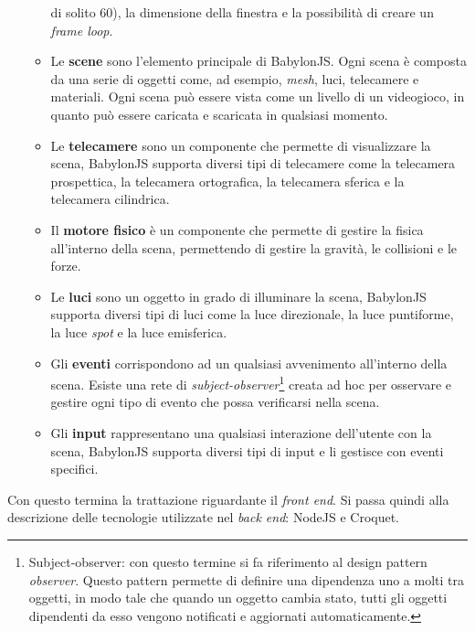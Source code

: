 \begin{itemize}
\begin{itemize}
        di solito 60), la dimensione della finestra e la possibilità di creare un \textit{frame loop}.
        \item Le \textbf{scene} sono l'elemento principale di BabylonJS. Ogni scena è composta da una serie di oggetti come, ad esempio, \textit{mesh}, luci, telecamere e materiali. Ogni scena
        può essere vista come un livello di un videogioco, in quanto può essere caricata e scaricata in qualsiasi momento.
        \item Le \textbf{telecamere} sono un componente che permette di visualizzare la scena, BabylonJS supporta diversi tipi di telecamere come la telecamera prospettica, la telecamera ortografica,
        la telecamera sferica e la telecamera cilindrica.
        \item Il \textbf{motore fisico} è un componente che permette di gestire la fisica all'interno della scena, permettendo di gestire la gravità, le collisioni e le forze.
        \item Le \textbf{luci} sono un oggetto in grado di illuminare la scena, BabylonJS supporta diversi tipi di luci come la luce direzionale, la luce puntiforme, la luce 
        \textit{spot} e la luce emisferica.
        \item Gli \textbf{eventi} corrispondono ad un qualsiasi avvenimento all'interno della scena. Esiste una rete di \textit{subject-observer}\footnote{
            Subject-observer: con questo termine si fa riferimento al design pattern \textit{observer}. Questo pattern permette di definire una dipendenza uno a molti tra oggetti,
            in modo tale che quando un oggetto cambia stato, tutti gli oggetti dipendenti da esso vengono notificati e aggiornati automaticamente.
        } creata ad hoc per osservare e gestire ogni tipo di evento che possa verificarsi nella scena.
        \item Gli \textbf{input} rappresentano una qualsiasi interazione dell'utente con la scena, BabylonJS supporta diversi tipi di input e li gestisce con eventi specifici.
    \end{itemize}
\end{itemize}
Con questo termina la trattazione riguardante il \textit{front end}. Si passa quindi alla descrizione delle tecnologie utilizzate nel \textit{back end}: NodeJS e Croquet.

